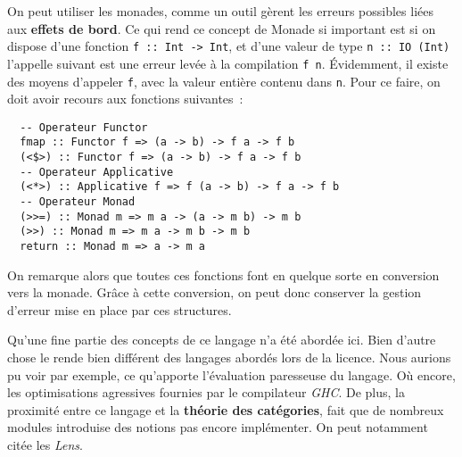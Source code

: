 On peut utiliser les monades, comme un outil gèrent les erreurs possibles 
liées aux \textbf{effets de bord}. Ce qui rend ce concept de Monade si 
important est si on dispose d'une fonction 
\texttt{f :: Int -> Int}, et d'une valeur de type 
\texttt{n :: IO (Int)} l'appelle suivant est une erreur levée à la 
compilation \texttt{f n}. Évidemment, il existe des moyens 
d'appeler \texttt{f}, avec la valeur entière contenu dans 
\texttt{n}. Pour ce faire, on doit avoir recours aux fonctions 
suivantes~: 

\begin{verbatim}
  -- Operateur Functor
  fmap :: Functor f => (a -> b) -> f a -> f b
  (<$>) :: Functor f => (a -> b) -> f a -> f b
  -- Operateur Applicative
  (<*>) :: Applicative f => f (a -> b) -> f a -> f b
  -- Operateur Monad
  (>>=) :: Monad m => m a -> (a -> m b) -> m b
  (>>) :: Monad m => m a -> m b -> m b
  return :: Monad m => a -> m a
\end{verbatim}

On remarque alors que toutes ces fonctions font en quelque sorte en conversion 
vers la monade. Grâce à cette conversion, on peut donc conserver la gestion 
d'erreur mise en place par ces structures.

Qu'une fine partie des concepts de ce langage n'a été abordée ici. Bien d'autre
chose le rende bien différent des langages abordés lors de la licence. Nous 
aurions pu voir par exemple, ce qu'apporte l'évaluation paresseuse du langage. 
Où encore, les optimisations agressives fournies par le compilateur 
\textit{GHC}. De plus, la proximité entre ce langage et la 
\textbf{théorie des catégories}, fait que de nombreux modules introduise des 
notions pas encore implémenter. On peut notamment citée les \textit{Lens}.